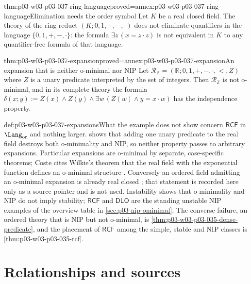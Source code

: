 \begin{hbtheorem}{thm:p03-w03-p03-037-ring-language}{proved=annex:p03-w03-p03-037-ring-language}{Elimination needs the order symbol}
Let \(K\) be a real closed field.  The theory of the ring reduct
\((K;0,1,+,-,\mathbin{\cdot})\) does not eliminate quantifiers in the
language \(\{0,1,+,-,\mathbin{\cdot}\}\): the formula
\(\exists z\,(x=z\mathbin{\cdot}z)\) is not equivalent in \(K\) to any
quantifier-free formula of that language.
\end{hbtheorem}

\begin{hbtheorem}{thm:p03-w03-p03-037-expansion}{proved=annex:p03-w03-p03-037-expansion}{An expansion that is neither o-minimal nor NIP}
Let \(\mathcal R_{\mathbb Z}=(\mathbb R;0,1,+,-,\mathbin{\cdot},<,Z)\) where
\(Z\) is a unary predicate interpreted by the set of integers.  Then
\(\mathcal R_{\mathbb Z}\) is not o-minimal, and in its complete theory the
formula
\(\delta(x;y):=Z(x)\wedge Z(y)\wedge\exists w\,(Z(w)\wedge y=x\mathbin{\cdot}w)\)
has the independence property.
\end{hbtheorem}

\begin{hbwarning}{def:p03-w03-p03-037-expansions}{What the example does not show}
 concern
\(\mathsf{RCF}\) in \(\Lang_{\mathrm{or}}\) and nothing larger.
 shows that adding one unary predicate to
the real field destroys both o-minimality and NIP, so neither property passes
to arbitrary expansions.  Particular expansions are o-minimal by separate,
case-specific theorems; Coste cites Wilkie's theorem that the real field with
the exponential function defines an o-minimal structure
\cite[p.~6]{Coste1999OMin}.  Conversely an ordered field admitting an
o-minimal expansion is already real closed \cite[p.~11,
Exercise~1.9]{Coste1999OMin}; that statement is recorded here only as a
source pointer and is not used.  Instability shows that o-minimality and NIP
do not imply stability; \(\mathsf{RCF}\) and \(\mathsf{DLO}\) are the
standing unstable NIP examples of the overview table in
\cref{sec:p03-nip-ominimal}.  The converse failure, an ordered theory that is
NIP but not o-minimal, is \cref{thm:p03-w03-p03-035-dense-predicate}, and the
placement of \(\mathsf{RCF}\) among the simple, stable and NIP classes is
\cref{thm:p03-w03-p03-035-rcf}.
\end{hbwarning}

\section{Relationships and sources}
\label{sec:p03-w03-p03-037-sources}

